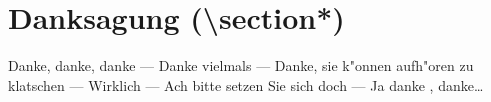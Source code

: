 \documentclass[article,colorback,accentcolor=tud4c]{tudreport}
\begin{document}
  \section*{Danksagung (\textbackslash section*)}    \noindent
      Danke, danke, danke --- Danke vielmals --- Danke, sie k"onnen aufh"oren zu klatschen ---
      Wirklich --- Ach bitte setzen Sie sich doch --- Ja danke , danke\dots

  \listoffigures{}
\end{document}
